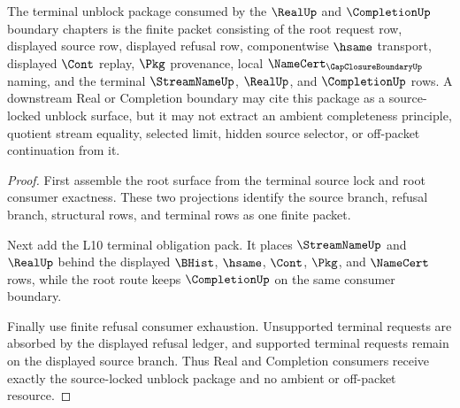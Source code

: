 \begin{theorem}
\label{thm:gap-closure-boundary-terminal-unblock-package}
The terminal unblock package consumed by the $\RealUp$ and $\CompletionUp$ boundary chapters is the finite packet consisting of the root request row, displayed source row, displayed refusal row, componentwise $\hsame$ transport, displayed $\Cont$ replay, $\Pkg$ provenance, local $\NameCert_{\GapClosureBoundaryUp}$ naming, and the terminal $\StreamNameUp$, $\RealUp$, and $\CompletionUp$ rows. A downstream Real or Completion boundary may cite this package as a source-locked unblock surface, but it may not extract an ambient completeness principle, quotient stream equality, selected limit, hidden source selector, or off-packet continuation from it.
\end{theorem}
\begin{proof}
First assemble the root surface from the terminal source lock and root consumer exactness. These two projections identify the source branch, refusal branch, structural rows, and terminal rows as one finite packet.

Next add the L10 terminal obligation pack. It places $\StreamNameUp$ and $\RealUp$ behind the displayed $\BHist$, $\hsame$, $\Cont$, $\Pkg$, and $\NameCert$ rows, while the root route keeps $\CompletionUp$ on the same consumer boundary.

Finally use finite refusal consumer exhaustion. Unsupported terminal requests are absorbed by the displayed refusal ledger, and supported terminal requests remain on the displayed source branch. Thus Real and Completion consumers receive exactly the source-locked unblock package and no ambient or off-packet resource.
\end{proof}
